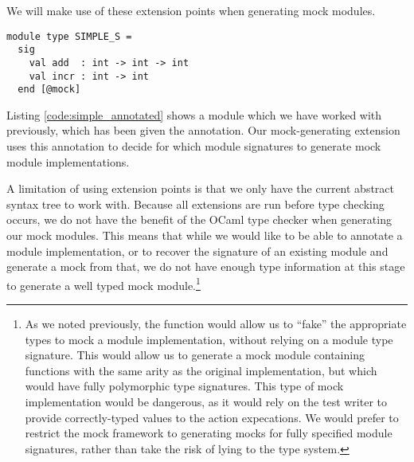 We will make use of these extension points when generating mock
modules.





\begin{lstlisting}[aboveskip=\baselineskip,
    caption={An annotated module, from which a mock module will be generated},
    label=code:simple_annotated]
module type SIMPLE_S =
  sig
    val add  : int -> int -> int
    val incr : int -> int
  end [@mock]
\end{lstlisting}

Listing \ref{code:simple_annotated} shows a module which we have
worked with previously, which has been given the \code{[@mock]}
annotation. Our mock-generating extension uses this annotation to
decide for which module signatures to generate mock module
implementations.

A limitation of using extension points is that we only have the
current abstract syntax tree to work with. Because all extensions are
run before type checking occurs, we do not have the benefit of the
OCaml type checker when generating our mock modules. This means that
while we would like to be able to annotate a module implementation, or
to recover the signature of an existing module and generate a mock
from that, we do not have enough type information at this stage to
generate a well typed mock module.\footnote{As we noted previously,
  the function  would allow us to ``fake'' the
  appropriate types to mock a module implementation, without relying
  on a module type signature. This would allow us to generate a mock
  module containing functions with the same arity as the original
  implementation, but which would have fully polymorphic type
  signatures. This type of mock implementation would be dangerous, as
  it would rely on the test writer to provide correctly-typed values
  to the action expecations. We would prefer to restrict the mock
  framework to generating mocks for fully specified module signatures,
  rather than take the risk of lying to the type system.}

